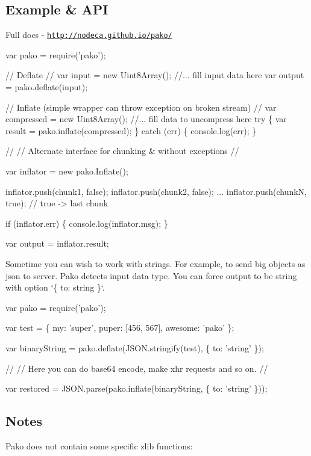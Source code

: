 \subsection*{Example \& A\+PI }

Full docs -\/ \href{http://nodeca.github.io/pako/}{\tt http\+://nodeca.\+github.\+io/pako/}


\begin{DoxyCode}
var pako = require('pako');

// Deflate
//
var input = new Uint8Array();
//... fill input data here
var output = pako.deflate(input);

// Inflate (simple wrapper can throw exception on broken stream)
//
var compressed = new Uint8Array();
//... fill data to uncompress here
try \{
  var result = pako.inflate(compressed);
\} catch (err) \{
  console.log(err);
\}

//
// Alternate interface for chunking & without exceptions
//

var inflator = new pako.Inflate();

inflator.push(chunk1, false);
inflator.push(chunk2, false);
...
inflator.push(chunkN, true); // true -> last chunk

if (inflator.err) \{
  console.log(inflator.msg);
\}

var output = inflator.result;
\end{DoxyCode}


Sometime you can wish to work with strings. For example, to send big objects as json to server. Pako detects input data type. You can force output to be string with option `\{ to\+: \textquotesingle{}string\textquotesingle{} \}`.


\begin{DoxyCode}
var pako = require('pako');

var test = \{ my: 'super', puper: [456, 567], awesome: 'pako' \};

var binaryString = pako.deflate(JSON.stringify(test), \{ to: 'string' \});

//
// Here you can do base64 encode, make xhr requests and so on.
//

var restored = JSON.parse(pako.inflate(binaryString, \{ to: 'string' \}));
\end{DoxyCode}


\subsection*{Notes }

Pako does not contain some specific zlib functions\+:


